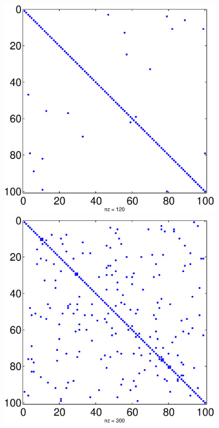 \documentclass{scrartcl}
\begin{document}
\begin{figure}[H]
  \begin{minipage}[b]{0.31\textwidth}
    \centering
    \includegraphics[scale=0.35]{prob_28_sp_k_10.eps}
  \end{minipage}
  \quad
  \begin{minipage}[b]{0.31\textwidth}
    \centering
    \includegraphics[scale=0.35]{prob_28_sp_k_100.eps}

\end{minipage}
\end{figure}
\end{document}

